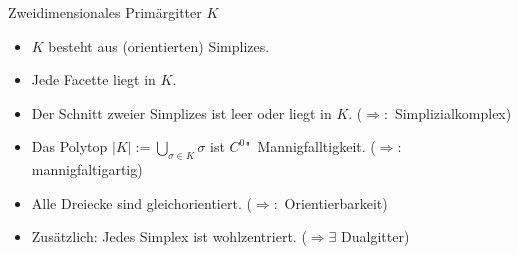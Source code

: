 \documentclass[handout]{beamer}
\begin{document}
  \begin{frame}
    \small
    \begin{block}{Zweidimensionales Primärgitter \( K \)}
      \begin{itemize}
        \setlength{\itemsep}{1pt}
        \item<1-> \( K \) besteht aus (orientierten) Simplizes.
        \item<2-> Jede Facette liegt in \( K \).
        \item<4-> Der Schnitt zweier Simplizes ist leer oder liegt in \( K \). (\( \Rightarrow :\) Simplizialkomplex)
        \item<6-> Das Polytop \( |K|:= \bigcup_{\sigma\in K} \sigma \) ist \( C^{0} \)"~Mannigfalltigkeit. (\( \Rightarrow :\) mannigfaltigartig)
        \item<8-> Alle Dreiecke sind gleichorientiert. (\( \Rightarrow :\) Orientierbarkeit)
        \item<9-> Zusätzlich: Jedes Simplex ist wohlzentriert. (\( \Rightarrow\exists \) Dualgitter)
      \end{itemize}
    \end{block}
      \begin{overprint}
         \centering
         \centering
         \centering
         \centering
         \centering
         \centering
         \centering
         \centering
         \centering
         \centering
      \end{overprint}
  \end{frame}
\end{document}
